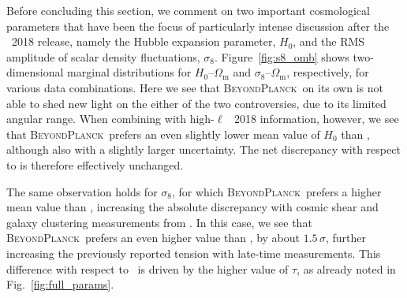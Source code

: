 \documentclass[twocolumn]{aa}
\newcommand{\BP}{\textsc{BeyondPlanck}}
\begin{document}
Before concluding this section, we comment on two important
cosmological parameters that have been the focus of particularly
intense discussion after the \Planck\ 2018 release, namely the Hubble
expansion parameter, $H_0$, and the RMS amplitude of scalar density
fluctuations, $\sigma_8$. Figure~\ref{fig:s8_omb} shows
two-dimensional marginal distributions for $H_0$--$\Omega_\mathrm{m}$
and $\sigma_8$--$\Omega_\mathrm{m}$, respectively, for various data
combinations. Here we see that \BP\ on its own is not able to shed new
light on the either of the two controversies, due to its limited
angular range. When combining with high-$\ell$ \Planck\ 2018
information, however, we see that \BP\ prefers an even slightly lower
mean value of $H_0$ than , although also with a slightly larger
uncertainty. The net discrepancy with respect to \citet{Riess2018a} is
therefore effectively unchanged.

The same observation holds for $\sigma_8$, for which \BP\ prefers a
higher mean value than \Planck, increasing the absolute discrepancy
with cosmic shear and galaxy clustering measurements from
\citet{KiDS2021}. In this case, we see that \BP\ prefers an even
higher value than \Planck, by about $1.5\,\sigma$, further increasing
the previously reported tension with late-time measurements. This
difference with respect to \Planck\ is driven by the higher value of
$\tau$, as already noted in Fig.~\ref{fig:full_params}.
\end{document}
